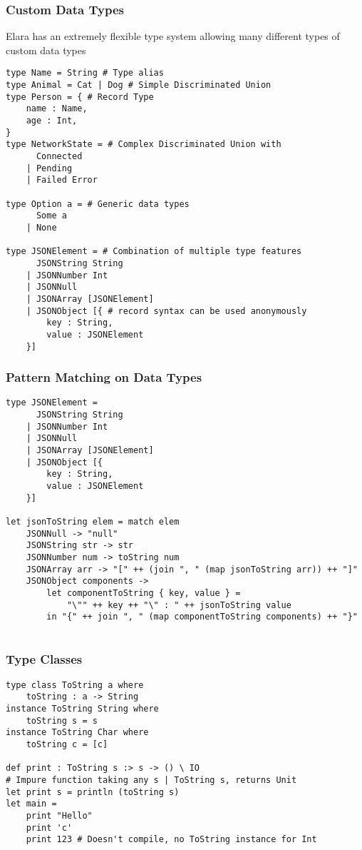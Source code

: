 \documentclass{article}
\begin{document}
\subsubsection{Custom Data Types}
Elara has an extremely flexible type system allowing many different types of custom data types
\begin{verbatim}
type Name = String # Type alias
type Animal = Cat | Dog # Simple Discriminated Union
type Person = { # Record Type
    name : Name,
    age : Int,
}
type NetworkState = # Complex Discriminated Union with
      Connected
    | Pending
    | Failed Error

type Option a = # Generic data types
      Some a
    | None

type JSONElement = # Combination of multiple type features
      JSONString String
    | JSONNumber Int
    | JSONNull
    | JSONArray [JSONElement]
    | JSONObject [{ # record syntax can be used anonymously
        key : String,
        value : JSONElement
    }] 
\end{verbatim}

\subsubsection{Pattern Matching on Data Types}
\begin{verbatim}
type JSONElement =
      JSONString String
    | JSONNumber Int
    | JSONNull
    | JSONArray [JSONElement]
    | JSONObject [{
        key : String,
        value : JSONElement
    }]

let jsonToString elem = match elem
    JSONNull -> "null"
    JSONString str -> str
    JSONNumber num -> toString num
    JSONArray arr -> "[" ++ (join ", " (map jsonToString arr)) ++ "]"
    JSONObject components -> 
        let componentToString { key, value } = 
            "\"" ++ key ++ "\" : " ++ jsonToString value
        in "{" ++ join ", " (map componentToString components) ++ "}"
    
\end{verbatim}

\subsubsection{Type Classes}
\begin{verbatim}
type class ToString a where
    toString : a -> String
instance ToString String where
    toString s = s
instance ToString Char where
    toString c = [c]

def print : ToString s :> s -> () \ IO
# Impure function taking any s | ToString s, returns Unit
let print s = println (toString s)
let main = 
    print "Hello"
    print 'c'
    print 123 # Doesn't compile, no ToString instance for Int
\end{verbatim}
\end{document}
